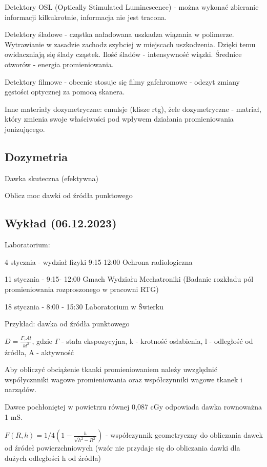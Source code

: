 \documentclass{article}
\begin{document}
Detektory OSL (Optically Stimulated Luminescence) - można wykonać zbieranie informacji kilkukrotnie, informacja nie jest tracona.

Detektory śladowe - cząstka naładowana uszkadza wiązania w polimerze. Wytrawianie w zasadzie zachodz szybciej w miejscach uszkodzenia. Dzięki temu owidaczniają się ślady cząstek. Ilość śladów - intensywność wiązki. Średnice otworów - energia promieniowania.

Detektory filmowe - obecnie stosuje się filmy gafchromowe - odczyt zmiany gęstości optycznej za pomocą skanera.

Inne materiały dozymetryczne: emulsje (klisze rtg), żele dozymetryczne - matriał, który zmienia swoje właściwości pod wpływem działania promieniowania jonizującego.

\subsection{Dozymetria}

Dawka skuteczna (efektywna)

Oblicz moc dawki od źródła punktowego

\subsection{Wykład (06.12.2023)}

Laboratorium:

4 stycznia - wydział fizyki 9:15-12:00 Ochrona radiologiczna

11 stycznia - 9:15- 12:00 Gmach Wydziału Mechatroniki (Badanie rozkładu pól promieniowania rozproszonego w pracowni RTG)

18 stycznia - 8:00 - 15:30 Laboratorium w Świerku

Przykład: dawka od źródła punktowego

$D = \frac{\Gamma_{\gamma} A t}{k l^2}$, gdzie $\Gamma$ - stała ekspozycyjna, k - krotność osłabienia, l - odległość od źródła, A - aktywność

Aby obliczyć obciążenie tkanki promieniowaniem należy uwzględnić współycznniki wagowe promieniowania oraz współczynniki wagowe tkanek i narządów.

Dawce pochłoniętej w powietrzu równej 0,087 cGy odpowiada dawka rownoważna 1 mS.

$F(R,h) = 1/4 \left(1 - \frac{h}{\sqrt{h^2-R^2}}\right)$ - współczynnik geometryczny do obliczania dawek od źródeł powierzchniowych (wzór nie przydaje się do obliczania dawki dla dużych odległości h od źródła)
\end{document}

